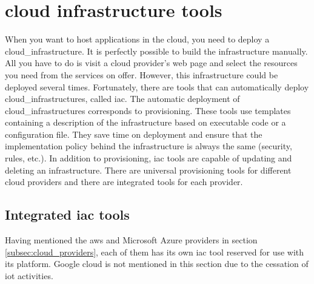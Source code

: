 \section{\texorpdfstring{\Gls{cloud}}{} infrastructure tools}
\label{subsec:iac_tools}

When you want to host applications in the \gls{cloud}, you need to deploy a \gls{cloud_infrastructure}. It is perfectly possible to build the infrastructure manually. All you have to do is visit a \gls{cloud} provider's web page and select the resources you need from the services on offer. However, this infrastructure could be deployed several times. Fortunately, there are tools that can automatically deploy \glspl{cloud_infrastructure}, called \acrfull{iac}. The automatic deployment of \glspl{cloud_infrastructure} corresponds to \gls{provisioning}. These tools use templates containing a description of the infrastructure based on executable code or a configuration file. They save time on deployment and ensure that the implementation policy behind the infrastructure is always the same (security, rules, etc.). In addition to \gls{provisioning}, \acrshort{iac} tools are capable of updating and deleting an infrastructure. There are universal \gls{provisioning} tools for different \gls{cloud} providers and there are integrated tools for each provider. \cite{iac_tools}

\subsection{Integrated \acrshort{iac} tools}
Having mentioned the \gls{aws} and Microsoft Azure providers in section \ref{subsec:cloud_providers}, each of them has its own \acrshort{iac} tool reserved for use with its platform. Google \Gls{cloud} is not mentioned in this section due to the cessation of \acrshort{iot} activities.

